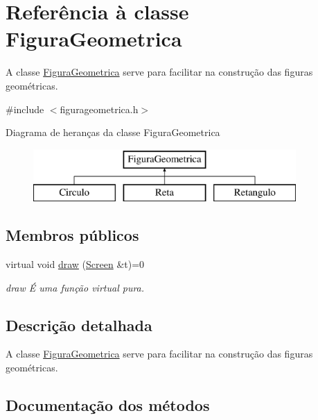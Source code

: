 \hypertarget{class_figura_geometrica}{}\section{Referência à classe Figura\+Geometrica}
\label{class_figura_geometrica}


A classe \mbox{\hyperlink{class_figura_geometrica}{Figura\+Geometrica}} serve para facilitar na construção das figuras geométricas.  




{\ttfamily \#include $<$figurageometrica.\+h$>$}

Diagrama de heranças da classe Figura\+Geometrica\begin{figure}[H]
\begin{center}
\leavevmode
\includegraphics[height=2.000000cm]{class_figura_geometrica}
\end{center}
\end{figure}
\subsection*{Membros públicos}
\begin{DoxyCompactItemize}
\item 
virtual void \mbox{\hyperlink{class_figura_geometrica_a8ee8dedc060b6059a805ea091aef2c41}{draw}} (\mbox{\hyperlink{class_screen}{Screen}} \&t)=0
\begin{DoxyCompactList}\small\item\em draw É uma função virtual pura. \end{DoxyCompactList}\end{DoxyCompactItemize}


\subsection{Descrição detalhada}
A classe \mbox{\hyperlink{class_figura_geometrica}{Figura\+Geometrica}} serve para facilitar na construção das figuras geométricas. 

\subsection{Documentação dos métodos}
\mbox{\label{class_figura_geometrica_a8ee8dedc060b6059a805ea091aef2c41}} 
